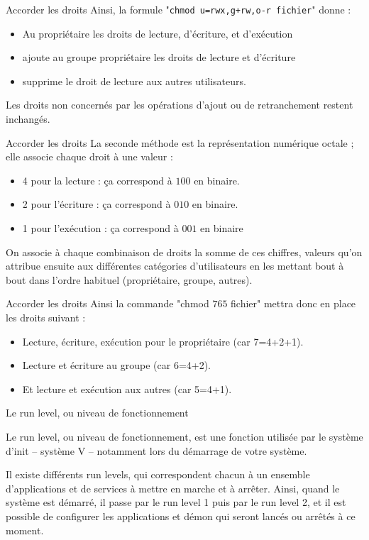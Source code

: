 \documentclass[10pt]{beamer}
\begin{document}
\begin{frame}{Accorder les droits}
Ainsi, la formule "\texttt{\alert{chmod} u=rwx,g+rw,o-r fichier}" donne :
\pause
\begin{itemize}
\item Au propriétaire les droits de lecture, d'écriture, et d'exécution
\item ajoute au groupe propriétaire les droits de lecture et d'écriture
\item supprime le droit de lecture aux autres utilisateurs.
\end{itemize}
Les droits non concernés par les opérations d'ajout ou de retranchement restent inchangés.
\end{frame}

\begin{frame}{Accorder les droits}
La seconde méthode est la représentation numérique octale ; elle associe chaque droit à une valeur :
\begin{itemize}
\item 4 pour la lecture : ça correspond à $100$ en binaire.
\item 2 pour l'écriture : ça correspond à $010$ en binaire.
\item 1 pour l'exécution : ça correspond à $001$ en binaire
\end{itemize}
\pause
On associe à chaque combinaison de droits la somme de ces chiffres, valeurs qu'on
attribue ensuite aux différentes catégories d'utilisateurs en les mettant bout à bout
dans l'ordre habituel (propriétaire, groupe, autres).
\end{frame}

\begin{frame}{Accorder les droits}
Ainsi la commande "\alert{chmod} $765$ fichier" mettra donc en place les droits suivant :
\pause
\begin{itemize}
\item Lecture, écriture, exécution pour le propriétaire (car 7=4+2+1).
\item Lecture et écriture au groupe (car 6=4+2).
\item Et lecture et exécution aux autres (car 5=4+1).
\end{itemize}
\end{frame}

\begin{frame}{Le run level, ou niveau de fonctionnement}
\begin{definition}
Le run level, ou niveau de fonctionnement, est une fonction utilisée par le système
d'init – système V – notamment lors du démarrage de votre système.

Il existe différents run levels, qui correspondent chacun à un ensemble d’applications et de services à mettre en marche et à arrêter. Ainsi, quand le système est démarré, il passe par le run level 1 puis par le run level 2, et il est possible de configurer les applications et démon qui seront lancés ou arrêtés à ce moment.
\end{definition}
\end{frame}
\end{document}
